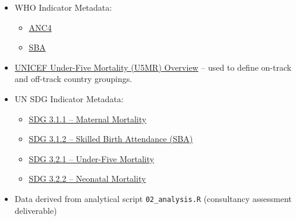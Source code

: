 \documentclass[
]{article}
\providecommand{\tightlist}{%
  \setlength{\itemsep}{0pt}\setlength{\parskip}{0pt}}
\begin{document}
\begin{itemize}
\tightlist
\item
  WHO Indicator Metadata:

  \begin{itemize}
  \tightlist
  \item
    \href{https://www.who.int/data/gho/indicator-metadata-registry/imr-details/80}{ANC4}
  \item
    \href{https://data.who.int/indicators/i/F835E3B/1772666}{SBA}
  \end{itemize}
\item
  \href{https://data.unicef.org/topic/child-survival/under-five-mortality/}{UNICEF
  Under-Five Mortality (U5MR) Overview} -- used to define on-track and
  off-track country groupings.
\item
  UN SDG Indicator Metadata:

  \begin{itemize}
  \tightlist
  \item
    \href{https://unstats.un.org/sdgs/metadata/files/Metadata-03-01-01.pdf}{SDG
    3.1.1 -- Maternal Mortality}
  \item
    \href{https://unstats.un.org/sdgs/metadata/files/Metadata-03-01-02.pdf}{SDG
    3.1.2 -- Skilled Birth Attendance (SBA)}
  \item
    \href{https://unstats.un.org/sdgs/metadata/files/Metadata-03-02-01.pdf}{SDG
    3.2.1 -- Under-Five Mortality}
  \item
    \href{https://unstats.un.org/sdgs/metadata/files/Metadata-03-02-02.pdf}{SDG
    3.2.2 -- Neonatal Mortality}
  \end{itemize}
\item
  Data derived from analytical script \texttt{02\_analysis.R}
  (consultancy assessment deliverable)
\end{itemize}
\end{document}
